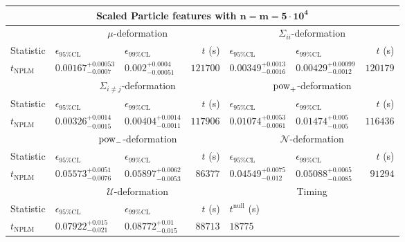 \begin{tabular}{l|llr|llr}
	\toprule
	\multicolumn{7}{c}{{\bf Scaled Particle features with $\mathbf{n=m=5\cdot 10^{4}}$}} \\
	\toprule
	\multicolumn{1}{c}{} & \multicolumn{3}{c}{$\mu$-deformation} & \multicolumn{3}{c}{$\Sigma_{ii}$-deformation} \\
	Statistic & $\epsilon_{95\%\mathrm{CL}}$ & $\epsilon_{99\%\mathrm{CL}}$ & $t$ (s) & $\epsilon_{95\%\mathrm{CL}}$ & $\epsilon_{99\%\mathrm{CL}}$ & $t$ (s) \\
	\midrule
	$t_{\mathrm{NPLM}}$ & $0.00167_{-0.0007}^{+0.00053}$ & $0.002_{-0.00051}^{+0.0004}$ & $121700$ & $0.00349_{-0.0016}^{+0.0013}$ & $0.00429_{-0.0012}^{+0.00099}$ & $120179$ \\
	\toprule
	\multicolumn{1}{c}{} & \multicolumn{3}{c}{$\Sigma_{i\neq j}$-deformation} & \multicolumn{3}{c}{$\rm{pow}_{+}$-deformation} \\
	Statistic & $\epsilon_{95\%\mathrm{CL}}$ & $\epsilon_{99\%\mathrm{CL}}$ & $t$ (s) & $\epsilon_{95\%\mathrm{CL}}$ & $\epsilon_{99\%\mathrm{CL}}$ & $t$ (s) \\
	\midrule
	$t_{\mathrm{NPLM}}$ & $0.00326_{-0.0015}^{+0.0014}$ & $0.00404_{-0.0011}^{+0.0014}$ & $117906$ & $0.01074_{-0.0061}^{+0.0053}$ & $0.01474_{-0.005}^{+0.005}$ & $116436$ \\
	\toprule
	\multicolumn{1}{c}{} & \multicolumn{3}{c}{$\rm{pow}_{-}$-deformation} & \multicolumn{3}{c}{$\mathcal{N}$-deformation} \\
	Statistic & $\epsilon_{95\%\mathrm{CL}}$ & $\epsilon_{99\%\mathrm{CL}}$ & $t$ (s) & $\epsilon_{95\%\mathrm{CL}}$ & $\epsilon_{99\%\mathrm{CL}}$ & $t$ (s) \\
	\midrule
	$t_{\mathrm{NPLM}}$ & $0.05573_{-0.0076}^{+0.0051}$ & $0.05897_{-0.0053}^{+0.0062}$ & $86377$ & $0.04549_{-0.012}^{+0.0075}$ & $0.05088_{-0.0085}^{+0.0065}$ & $91294$ \\
	\toprule
	\multicolumn{1}{c}{} & \multicolumn{3}{c}{$\mathcal{U}$-deformation} & \multicolumn{3}{c}{Timing} \\
	Statistic & $\epsilon_{95\%\mathrm{CL}}$ & $\epsilon_{99\%\mathrm{CL}}$ & $t$ (s) & $t^{\mathrm{null}}$ (s) \\
	\midrule
	$t_{\mathrm{NPLM}}$ & $0.07922_{-0.021}^{+0.015}$ & $0.08772_{-0.015}^{+0.01}$ & $88713$ & $18775$ \\
	\bottomrule
\end{tabular}